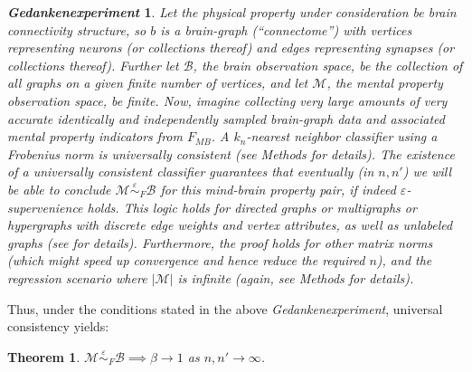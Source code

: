 \documentclass{article}
\newcommand{\conv}{\rightarrow}
\newcommand{\mB}{\mathcal{B}}
\newcommand{\mM}{\mathcal{M}}
\providecommand{\mc}[1]{\mathcal{#1}}
\newcommand{\MeB}{\mM \overset{\varepsilon}{{\sim}}_{F} \mB}
\newtheorem{thm}{Theorem}
\newtheorem{thex}{\emph{Gedankenexperiment}}
\begin{document}

\begin{thex} \label{exp:1}
Let the physical property under consideration be brain connectivity structure, so $b$ is a brain-graph (``connectome'') with vertices representing neurons (or collections thereof) and edges representing synapses (or collections thereof). Further let $\mB$, the brain observation space, be the collection of all graphs on a given finite number of vertices, and let $\mc{M}$, the mental property observation space, be finite. Now, imagine collecting very large amounts of very accurate identically and independently sampled  brain-graph data and associated mental property indicators from $F_{MB}$. A $k_n$-nearest neighbor classifier using a Frobenius norm is universally consistent (see Methods for details). 
The existence of a universally consistent classifier guarantees that eventually (in $n,n'$) we will be able to conclude $\MeB$ for this mind-brain property pair, if indeed $\varepsilon$-supervenience holds. This logic holds for directed graphs or multigraphs or hypergraphs with discrete edge weights and vertex attributes, as well as unlabeled graphs (see \cite{VP11_unlabeled} for details). Furthermore, the proof holds for other matrix norms (which might speed up convergence and hence reduce the required $n$), and the regression scenario where $|\mM|$ is infinite (again, see Methods for details).  
\end{thex}
Thus, under the conditions stated in the above \emph{Gedankenexperiment}, universal consistency yields:
\begin{thm} \label{thm:3}
	$\MeB \implies \beta \conv 1$ as $n,n'\conv \infty$.
\end{thm}
\end{document}
